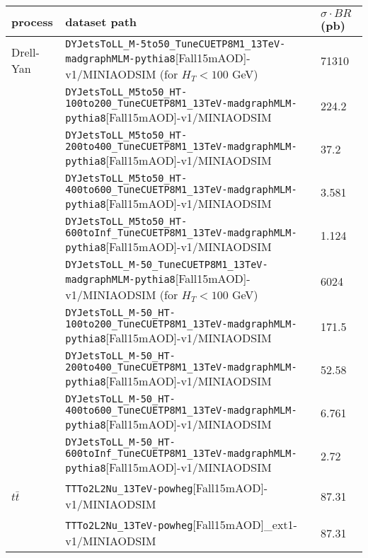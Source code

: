 \begin{table}
  \center
  \tiny
  \begin{tabular}{l|l|l}
     process                & dataset path & $\sigma \cdot BR$ (pb)\\
     \hline
     Drell-Yan              & \verb /DYJetsToLL_M-5to50_TuneCUETP8M1_13TeV-madgraphMLM-pythia8/[Fall15mAOD]-v1/MINIAODSIM \; (for $H_T < 100$ GeV)          & 71310 \\ 
                            & \verb /DYJetsToLL_M5to50_HT-100to200_TuneCUETP8M1_13TeV-madgraphMLM-pythia8/[Fall15mAOD]-v1/MINIAODSIM                        & 224.2 \\
                            & \verb /DYJetsToLL_M5to50_HT-200to400_TuneCUETP8M1_13TeV-madgraphMLM-pythia8/[Fall15mAOD]-v1/MINIAODSIM                        & 37.2 \\
                            & \verb /DYJetsToLL_M5to50_HT-400to600_TuneCUETP8M1_13TeV-madgraphMLM-pythia8/[Fall15mAOD]-v1/MINIAODSIM                        & 3.581 \\
                            & \verb /DYJetsToLL_M5to50_HT-600toInf_TuneCUETP8M1_13TeV-madgraphMLM-pythia8/[Fall15mAOD]-v1/MINIAODSIM                        & 1.124 \\
                            & \verb /DYJetsToLL_M-50_TuneCUETP8M1_13TeV-madgraphMLM-pythia8/[Fall15mAOD]-v1/MINIAODSIM \; (for $H_T < 100$ GeV)             & 6024 \\
                            & \verb /DYJetsToLL_M-50_HT-100to200_TuneCUETP8M1_13TeV-madgraphMLM-pythia8/[Fall15mAOD]-v1/MINIAODSIM                          & 171.5 \\
                            & \verb /DYJetsToLL_M-50_HT-200to400_TuneCUETP8M1_13TeV-madgraphMLM-pythia8/[Fall15mAOD]-v1/MINIAODSIM                          & 52.58 \\
                            & \verb /DYJetsToLL_M-50_HT-400to600_TuneCUETP8M1_13TeV-madgraphMLM-pythia8/[Fall15mAOD]-v1/MINIAODSIM                          & 6.761 \\
                            & \verb /DYJetsToLL_M-50_HT-600toInf_TuneCUETP8M1_13TeV-madgraphMLM-pythia8/[Fall15mAOD]-v1/MINIAODSIM                          & 2.72 \\
     $t\bar{t}$             & \verb /TTTo2L2Nu_13TeV-powheg/[Fall15mAOD]-v1/MINIAODSIM                                                                      & 87.31 \\
                            & \verb /TTTo2L2Nu_13TeV-powheg/[Fall15mAOD]_ext1-v1/MINIAODSIM								    & 87.31 \\

\end{tabular}
\end{table}
